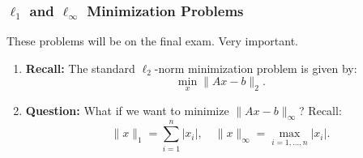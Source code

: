 \subsubsection{\( \ell_1 \) and \( \ell_\infty \) Minimization Problems}
\begin{warning}
    These problems will be on the final exam. Very important.
\end{warning}
\begin{example} 
    \begin{enumerate}
        \item \textbf{Recall:}
        The standard \( \ell_2 \)-norm minimization problem is given by:
        \[
        \min_x \|A x - b\|_2.
        \]
    
        \item \textbf{Question:}
        What if we want to minimize \( \|A x - b\|_\infty \)? Recall:
        \[
        \|x\|_1 = \sum_{i=1}^n |x_i|, \quad \|x\|_\infty = \max_{i=1,\dots,n} |x_i|.
        \]
    

\end{enumerate}
\end{example}
